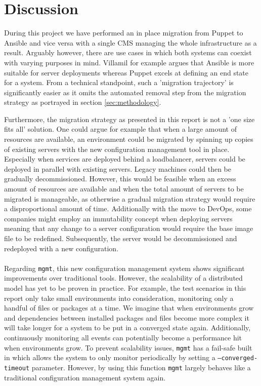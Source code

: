 \section{Discussion}\label{sec:discussion}
During this project we have performed an in place migration from Puppet to Ansible and vice versa with a single CMS managing the whole infrastructure as a result. Arguably however, there are use cases in which both systems can coexist with varying purposes in mind. Villamil \cite{villamil_2014} for example argues that Ansible is more suitable for server deployments whereas Puppet excels at defining an end state for a system. From a technical standpoint, such a 'migration trajectory' is significantly easier as it omits the automated removal step from the migration strategy as portrayed in section \ref{sec:methodology}.

Furthermore, the migration strategy as presented in this report is not a 'one size fits all' solution. One could argue for example that when a large amount of resources are available, an environment could be migrated by spinning up copies of existing servers with the new configuration management tool in place. Especially when services are deployed behind a loadbalancer, servers could be deployed in parallel with existing servers. Legacy machines could then be gradually decommissioned. However, this would be feasible when an excess amount of resources are available and when the total amount of servers to be migrated is manageable, as otherwise a gradual migration strategy would require a disproportional amount of time. Additionally with the move to DevOps, some companies might employ an immutability concept when deploying servers meaning that any change to a server configuration would require the base image file to be redefined. Subsequently, the server would be decommissioned and redeployed with a new configuration. 
\\\\
Regarding \texttt{mgmt}, this new configuration management system shows significant improvements over traditional tools. However, the scalability of a distributed model has yet to be proven in practice. For example, the test scenarios in this report only take small environments into consideration, monitoring only a handful of files or packages at a time. We imagine that when environments grow and dependencies between installed packages and files become more complex it will take longer for a system to be put in a converged state again. Additionally, continuously monitoring all events can potentially become a performance hit when environments grow. To prevent scalability issues, \texttt{mgmt} has a fail-safe built in which allows the system to only monitor periodically by setting a \texttt{--converged-timeout} parameter. However, by using this function \texttt{mgmt} largely behaves like a traditional configuration management system again.  

